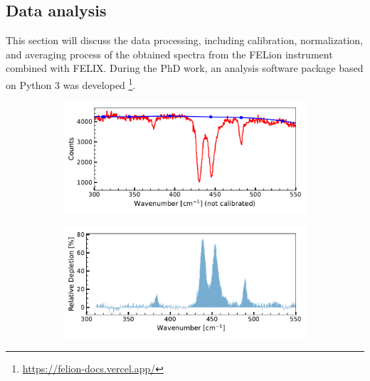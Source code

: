 \subsection{Data analysis}
\label{subsec:ir:data-analysis}

This section will discuss the data processing, including calibration, normalization, and averaging process of the obtained spectra from the FELion instrument combined with FELIX. During the PhD work, an analysis software package based on Python 3 was developed \footnote{\url{https://felion-docs.vercel.app/}}.\\

\begin{figure}[!htb]
    \centering
    
    \begin{subfigure}[b]{0.45\textwidth}
        \includegraphics[width=1\textwidth]{figures/IR-data-norm/baseline_correction.pdf}
        \caption{}
        \label{fig:data-process:raw}
    \end{subfigure}
    \hfill
    \begin{subfigure}[b]{0.45\textwidth}
        \centering
        \includegraphics[width=1\textwidth]{figures/IR-data-norm/processed.pdf}
        \caption{}
        \label{fig:data-process:processed}
        \end{subfigure}
    \hfill

\end{figure}
